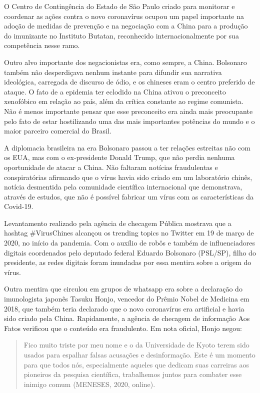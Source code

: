 O Centro de Contingência do Estado de São Paulo criado para monitorar e
coordenar as ações contra o novo coronavírus ocupou um papel importante
na adoção de medidas de prevenção e na negociação com a China para a
produção do imunizante no Instituto Butatan, reconhecido
internacionalmente por sua competência nesse ramo.

Outro alvo importante dos negacionistas era, como sempre, a China.
Bolsonaro também não desperdiçava nenhum instante para difundir sua
narrativa ideológica, carregada de discurso de ódio, e os chineses eram
o centro preferido de ataque. O fato de a epidemia ter eclodido na China
ativou o preconceito xenofóbico em relação ao país, além da crítica
constante ao regime comunista. Não é menos importante pensar que esse
preconceito era ainda mais preocupante pelo fato de estar hostilizando
uma das mais importantes potências do mundo e o maior parceiro comercial
do Brasil.

A diplomacia brasileira na era Bolsonaro passou a ter relações estreitas
não com os EUA, mas com o ex-presidente Donald Trump, que não perdia
nenhuma oportunidade de atacar a China. Não faltaram notícias
fraudulentas e conspiratórias afirmando que o vírus havia sido criado em
um laboratório chinês, notícia desmentida pela comunidade científica
internacional que demonstrava, através de estudos, que não é possível
fabricar um vírus com as características da Covid-19.

Levantamento realizado pela agência de checagem Pública mostrava que a
hashtag \#VirusChines alcançou os trending topics no Twitter em 19 de
março de 2020, no início da pandemia. Com o auxílio de robôs e também de
influenciadores digitais coordenados pelo deputado federal Eduardo
Bolsonaro (PSL/SP), filho do presidente, as redes digitais foram
inundadas por essa mentira sobre a origem do vírus.

Outra mentira que circulou em grupos de whatsapp era sobre a declaração
do imunologista japonês Tasuku Honjo, vencedor do Prêmio Nobel de
Medicina em 2018, que também teria declarado que o novo coronavírus era
artificial e havia sido criado pela China. Rapidamente, a agência de
checagem de informação Aos Fatos verificou que o conteúdo era
fraudulento. Em nota oficial, Honjo negou:

\begin{quote}
Fico muito triste por meu nome e o da Universidade de Kyoto terem sido
usados ​​para espalhar falsas acusações e desinformação. Este é um
momento para que todos nós, especialmente aqueles que dedicam suas
carreiras aos pioneiros da pesquisa científica, trabalhemos juntos para
combater esse inimigo comum (MENESES, 2020, online).
\end{quote}

